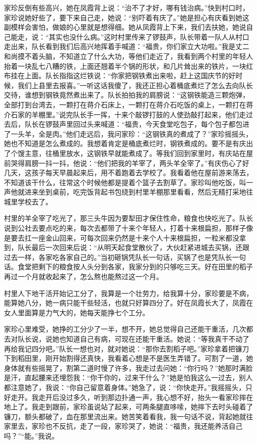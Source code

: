 \documentclass[12pt,UTF8]{ctexbook}
\begin{document}
家珍反倒有些高兴，她在凤霞背上说：“治不了才好，哪有钱治病。”快到村口时，家珍说她好些了，要下来自己走，她说：“别吓着有庆了。”她是担心有庆看到她这副模样会害怕，做娘的心里就是想得细。她从凤霞背上下来，我们去扶她，她说自己能走，说：“其实也没什么病。”这时村里传来了锣鼓声，队长带着一队人从村口走出来，队长看到我们后高兴地挥着手喊道：“福贵，你们家立大功啦。”我是丈二和尚摸不着头脑，不知道立了什么大功，等他们走近了，我看到两个村里的年轻人抬着一块乱七八糟的铁，上面还翘着半个锅的形状，和几片耸出来的铁片，一块红布挂在上面。队长指指这烂铁说：“你家把钢铁煮出来啦，赶上这国庆节的好时候，我们上县里去报喜。”一听这话我傻了，我还正担心着桶底煮烂了怎么去向队长交待，谁想到钢铁竟然煮出来了。队长拍拍我的肩膀说：“这钢铁能造三颗炮弹，全部打到台湾去，一颗打在蒋介石床上，一颗打在蒋介石吃饭的桌上，一颗打在蒋介石家的羊棚里。”说完队长手一挥，十来个敲锣打鼓的人使劲敲打起来，他们走过去后，队长在锣鼓声里回过头来喊道：“福贵，今天食堂吃包子，每个包子都包进了一头羊，全是肉。”他们走远后，我问家珍：“这钢铁真的煮成了？”家珍摇摇头，她也不知道是怎么煮成的。我想着肯定是桶底煮烂时，钢铁煮成的。要不是有庆出了个馊主意，往桶里放水，这钢铁早就能煮成了。等我们回到家里时，有庆站在屋前哭得肩膀一抖一抖，他说：“他们把我的羊宰了，两头羊全宰了。”有庆伤心了好几天，这孩子每天早晨起来后，用不着跑着去学校了。我看着他在屋前游来荡去，不知道该干什么，往常这个时候他都是提着个篮子去割草了。家珍叫他吃饭，叫一声他就进来坐到桌前，吃完饭背起书包绕到村里羊棚那里看看，然后无精打采地往城里学校去了。

村里的羊全宰了吃光了，那三头牛因为要犁田才保住性命，粮食也快吃光了。队长说到公社去要点吃的来，每次去都带了十来个年轻人，打着十来根扁担，那样子像是要去扛一座金山回来，可每次回来仍然是十来个人十来根扁担，一粒米都没拿到，队长最后一次回来后说：“从明天起食堂散伙了，大伙赶紧进城去买锅，还跟过去一样，各家吃各家自己的。”当初砸锅凭队长一句话，买锅了也是凭队长一句话。食堂把剩下的粮食按人头分到各家，我家分到的只够吃三天。好在田里的稻子再过一个月就收起来了，怎么熬也能熬过这一个月。

村里人下地干活开始记工分了，我算是一个壮劳力，给我算十分，家珍要是不病，能算她八分，她一病只能干些轻活，也就只好算四分了。好在凤霞长大了，凤霞在女人里面算是力气大的，她每天能挣七个工分。

家珍心里难受，她挣的工分少了一半，想不开，她总觉得自己还能干重活，几次都去对队长说，说她也知道自己有病，可现在还能干重活。她说：“等我真干不动了再给我记四分吧。”队长一想也对，就对她说：“那你去割稻子吧。”家珍拿着把镰刀下到稻田里，刚开始割得还真快，我看着心想是不是医生弄错了。可割了一道，她身体就有些摇晃了，割第二道时慢了许多，我走过去问她：“你行吗？”她那时满脸是汗，直起腰来还埋怨我：“你干你的，过来干什么？”她是怕我这么一过去，别人都注意她了，我说：“你自己留意着身体。”她急了，说：“你快走开。”我摇摇头，只好走开。我走开后没过多久，听到那边扑通一声，我心想不好，抬头一看家珍摔在地上了。我走到跟前，家珍虽说站了起来，可两条腿直哆嗦，她摔下去时头碰着了镰刀，额头都破了，血在那里流出来。她苦笑着看我，我一句话不说，背起她就往家里去，家珍也不反抗，走了一段，家珍哭了，她说：“福贵，我还能养活自己吗？”“能。”我说。
\end{document}
